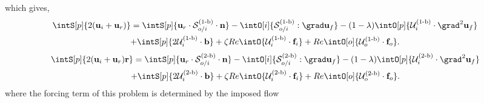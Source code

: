 which gives, 
\begin{multline}
    \intS[p]{2(\textbf{u}_{i} + \textbf{u}_r)}
    =
    \intS[p]{\textbf{u}_{r}\cdot \mathcal{S}^\text{(1-b)}_{o/i} \cdot \textbf{n}}
    - \intO[i]{\mathcal{S}^\text{(1-b)}_{o/i} :\grad\textbf{u}_f}
    - (1-\lambda) \intO[p]{\mathcal{U}^\text{(1-b)}_{i} \cdot \grad^2 \textbf{u}_f }\\
    + \intS[p]{2 \mathcal{U}^\text{(1-b)}_{i}  \cdot  \textbf{b}}
    + \zeta Re \intO{\mathcal{U}^\text{(1-b)}_{i} \cdot \textbf{f}_{i}} 
    + Re\intO[o]{\mathcal{U}^\text{(1-b)}_{o}\cdot \textbf{f}_{o}}.
\end{multline}
\begin{multline}
    \intS[p]{2(\textbf{u}_{i} + \textbf{u}_r)\textbf{r}}
    =
    \intS[p]{\textbf{u}_{r}\cdot \mathcal{S}^\text{(2-b)}_{o/i} \cdot \textbf{n}}
    - \intO[i]{\mathcal{S}^\text{(2-b)}_{o/i} :\grad\textbf{u}_f}
    - (1-\lambda) \intO[p]{\mathcal{U}^\text{(2-b)}_{i} \cdot \grad^2 \textbf{u}_f }\\
    + \intS[p]{2\mathcal{U}^\text{(2-b)}_{i} \cdot  \textbf{b}}
    + \zeta Re \intO{\mathcal{U}^\text{(2-b)}_{i} \cdot \textbf{f}_{i}} 
    + Re\intO[o]{\mathcal{U}^\text{(2-b)}_{o}\cdot \textbf{f}_{o}}.
    \label{eq:un}
\end{multline}
where the forcing term of this problem is determined by the imposed flow

